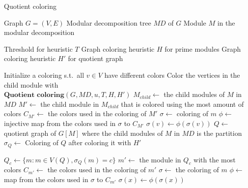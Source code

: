 \documentclass[a4paper]{article}
\begin{document}
\begin{algorithm}[H]
\caption{Quotient coloring}
\begin{algorithmic}[1]
    \REQUIRE Graph $G = (V,E)$ 
    \REQUIRE Modular decomposition tree $MD$ of $G$
    \REQUIRE Module $M$ in the modular decomposition

    \REQUIRE Threshold for heuristic $T$
    \REQUIRE Graph coloring heuristic $H$ for prime modules
    \REQUIRE Graph coloring heuristic $H'$ for quotient graph

    \STATE Initialize a coloring s.t.\ all $v \in V$
           have different colors
        \STATE Color the vertices in the child module with \\
        $\textbf{Quotient coloring}(G,MD,u,T,H,H')$
    \ENDFOR
      \STATE $M_{child} \leftarrow $ the child modules of $M$ in $MD$
      \STATE $M' \leftarrow $ the child module in $M_{child}$ that is colored using the most amount of colors
      \STATE $C_{M'} \leftarrow $ the colors used in the coloring of $M'$
         \STATE $\sigma \leftarrow $ coloring of $m$
         \STATE $\phi \leftarrow $ injective map from the colors used in $\sigma$ to $C_{M'}$
            \STATE $\sigma(v)\leftarrow \phi(\sigma(v))$  
         \ENDFOR
      \ENDFOR
            \RETURN
        \ENDIF
        \STATE $Q \leftarrow $ quotient graph of $G[M]$ where the child modules of $M$ in $MD$ is the partition
        \STATE $\sigma_Q \leftarrow $ Coloring of $Q$ after coloring it with $H'$

            \STATE $Q_c \leftarrow \{ m : m \in V(Q), \sigma_Q(m) = c\}$
            \STATE $m' \leftarrow$ the module in $Q_c$ with the most colors
            \STATE $C_{m'} \leftarrow$ the colors used in the coloring of $m'$
                \STATE $\sigma \leftarrow $ the coloring of $m$
                \STATE $\phi \leftarrow $ map from the colors used in $\sigma$ to $C_{m'}$
                    \STATE $\sigma(x) \leftarrow \phi(\sigma(x))$
                \ENDFOR
            \ENDFOR
        \ENDFOR
    \ENDIF
\end{algorithmic}
\end{algorithm}
\end{document}
